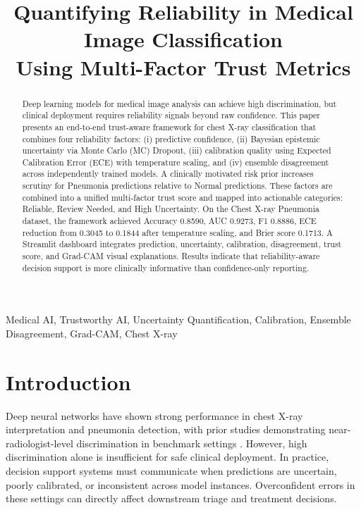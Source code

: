 \documentclass[conference]{IEEEtran}
\title{Quantifying Reliability in Medical Image Classification\\
Using Multi-Factor Trust Metrics}
\author{\IEEEauthorblockN{Kishore S}
\IEEEauthorblockA{Independent Researcher\\
Email: your-email@example.com}}
\begin{document}
\maketitle

\begin{abstract}
Deep learning models for medical image analysis can achieve high discrimination, but clinical deployment requires reliability signals beyond raw confidence. This paper presents an end-to-end trust-aware framework for chest X-ray classification that combines four reliability factors: (i) predictive confidence, (ii) Bayesian epistemic uncertainty via Monte Carlo (MC) Dropout, (iii) calibration quality using Expected Calibration Error (ECE) with temperature scaling, and (iv) ensemble disagreement across independently trained models. A clinically motivated risk prior increases scrutiny for Pneumonia predictions relative to Normal predictions. These factors are combined into a unified multi-factor trust score and mapped into actionable categories: Reliable, Review Needed, and High Uncertainty. On the Chest X-ray Pneumonia dataset, the framework achieved Accuracy 0.8590, AUC 0.9273, F1 0.8886, ECE reduction from 0.3045 to 0.1844 after temperature scaling, and Brier score 0.1713. A Streamlit dashboard integrates prediction, uncertainty, calibration, disagreement, trust score, and Grad-CAM visual explanations. Results indicate that reliability-aware decision support is more clinically informative than confidence-only reporting.
\end{abstract}

\begin{IEEEkeywords}
Medical AI, Trustworthy AI, Uncertainty Quantification, Calibration, Ensemble Disagreement, Grad-CAM, Chest X-ray
\end{IEEEkeywords}

\section{Introduction}
Deep neural networks have shown strong performance in chest X-ray interpretation and pneumonia detection, with prior studies demonstrating near-radiologist-level discrimination in benchmark settings \cite{rajpurkar2017chexnet}. However, high discrimination alone is insufficient for safe clinical deployment. In practice, decision support systems must communicate when predictions are uncertain, poorly calibrated, or inconsistent across model instances. Overconfident errors in these settings can directly affect downstream triage and treatment decisions.
\end{document}
